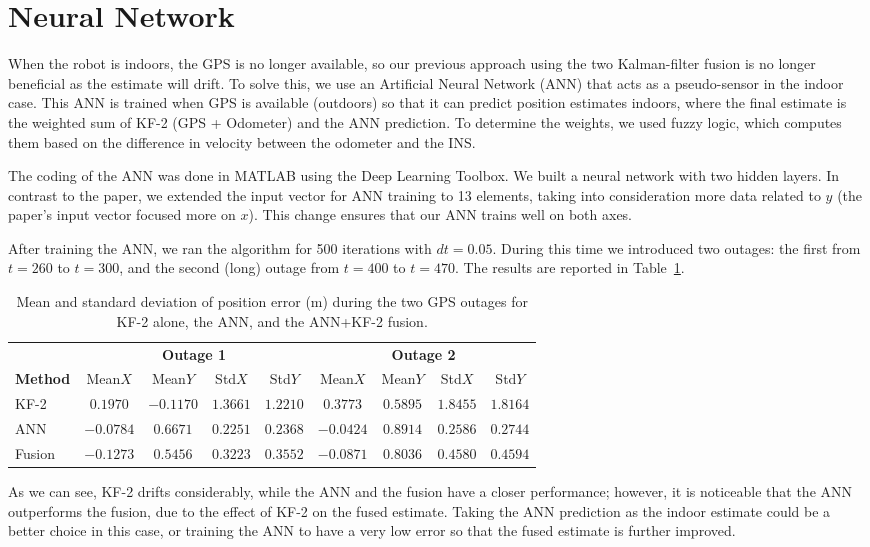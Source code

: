 \documentclass[11pt,a4paper]{article}
\begin{document}
\section{Neural Network}

When the robot is indoors, the GPS is no longer available, so our previous approach
using the two Kalman-filter fusion is no longer beneficial as the estimate will
drift. To solve this, we use an Artificial Neural Network (ANN) that acts as a
pseudo-sensor in the indoor case. This ANN is trained when GPS is available
(outdoors) so that it can predict position estimates indoors, where the final
estimate is the weighted sum of KF-2 (GPS + Odometer) and the ANN prediction. To
determine the weights, we used fuzzy logic, which computes them based on the
difference in velocity between the odometer and the INS.

The coding of the ANN was done in MATLAB using the Deep Learning Toolbox. We built a
neural network with two hidden layers. In contrast to the paper, we extended the
input vector for ANN training to 13 elements, taking into consideration more data
related to $y$ (the paper's input vector focused more on $x$). This change ensures
that our ANN trains well on both axes.

After training the ANN, we ran the algorithm for 500 iterations with $dt = 0.05$.
During this time we introduced two outages: the first from $t=260$ to $t=300$, and
the second (long) outage from $t=400$ to $t=470$. The results are reported in
Table~\ref{tab:ann}.

\begin{table}[H]
\centering
\setlength{\tabcolsep}{5pt}
\begin{tabular}{l cccc cccc}
\toprule
& \multicolumn{4}{c}{\textbf{Outage 1}} & \multicolumn{4}{c}{\textbf{Outage 2}}\\
\cmidrule(lr){2-5}\cmidrule(lr){6-9}
\textbf{Method} & Mean$X$ & Mean$Y$ & Std$X$ & Std$Y$
                & Mean$X$ & Mean$Y$ & Std$X$ & Std$Y$\\
\midrule
KF-2   & $0.1970$  & $-0.1170$ & $1.3661$ & $1.2210$ & $0.3773$  & $0.5895$ & $1.8455$ & $1.8164$\\
ANN    & $-0.0784$ & $0.6671$  & $0.2251$ & $0.2368$ & $-0.0424$ & $0.8914$ & $0.2586$ & $0.2744$\\
Fusion & $-0.1273$ & $0.5456$  & $0.3223$ & $0.3552$ & $-0.0871$ & $0.8036$ & $0.4580$ & $0.4594$\\
\bottomrule
\end{tabular}
\caption{Mean and standard deviation of position error (m) during the two GPS
outages for KF-2 alone, the ANN, and the ANN+KF-2 fusion.}
\label{tab:ann}
\end{table}

As we can see, KF-2 drifts considerably, while the ANN and the fusion have a closer
performance; however, it is noticeable that the ANN outperforms the fusion, due to
the effect of KF-2 on the fused estimate. Taking the ANN prediction as the indoor
estimate could be a better choice in this case, or training the ANN to have a very
low error so that the fused estimate is further improved.
\end{document}
